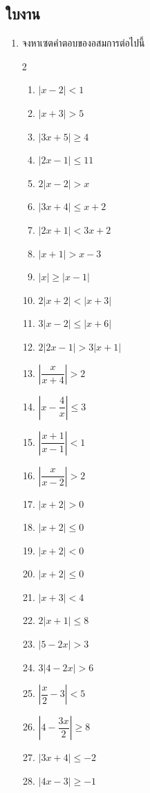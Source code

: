 \subsection*{ใบงาน}
\begin{enumerate}[label=\arabic*., leftmargin=*]
	\item จงหาเซตคำตอบของอสมการต่อไปนี้
\begin{multicols}{2}
		\begin{enumerate}[label=\theenumi\arabic*), leftmargin=*]
		\item $\left|x-2\right|<1$
		\item $\left|x+3\right|>5$
		\item $\left|3 x+5\right| \geq 4$
		\item $\left|2 x-1\right| \leq 11$
		\item $2\left|x-2\right|>x$
		\item $\left|3 x+4\right| \leq x+2$
		\item $\left|2 x+1\right|<3 x+2$
		\item $\left|x+1\right|>x-3$
		\item $\left|x\right| \geq\left|x-1\right|$
		\item $2\left|x+2\right|<\left|x+3\right|$
		\item $3\left|x-2\right| \leq\left|x+6\right|$
		\item $2\left|2 x-1\right|>3\left|x+1\right|$
		\item $\left|\dfrac{x}{x+4}\right|>2$
		\item $\left|x-\dfrac{4}{x}\right| \leq 3$
		\item $\left|\dfrac{x+1}{x-1}\right|<1$
		\item $\left|\dfrac{x}{x-2}\right|>2$
			\item $|x + 2| > 0$
		\item $|x + 2| \leqslant 0$
		\item $|x + 2| < 0$
		\item $|x + 2| \leqslant 0$
		\item $|x + 3| < 4$
		\item $2|x + 1| \leqslant 8$
		\item $|5 - 2x| > 3$
		\item $3|4 - 2x| > 6$
		\item $\left|\dfrac{x}{2} - 3\right| < 5$
		\item $\left|4 - \dfrac{3x}{2}\right| \geqslant 8$
		\item $|3 x + 4| \leqslant -2$
		\item $|4x - 3| \geqslant -1$

\end{enumerate}
\end{multicols}
\end{enumerate}
